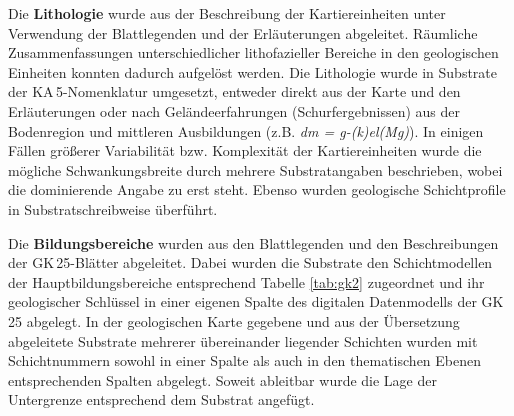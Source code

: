 Die \textbf{Lithologie} wurde aus der Beschreibung der Kartiereinheiten  unter Verwendung der Blattlegenden und der Erläuterungen abgeleitet. Räumliche Zusammenfassungen unterschiedlicher lithofazieller Bereiche in den geologischen Einheiten konnten dadurch aufgelöst werden. Die Lithologie wurde in Substrate der KA\,5-Nomenklatur umgesetzt, entweder direkt aus der Karte und den Erläuterungen oder nach Geländeerfahrungen (Schurfergebnissen) aus der Bodenregion und mittleren Ausbildungen (z.B. \textit{dm = g-(k)el(Mg)}).  In einigen Fällen größerer Variabilität bzw. Komplexität der Kartiereinheiten wurde die mögliche Schwankungsbreite durch mehrere Substratangaben beschrieben, wobei die dominierende Angabe zu erst steht. Ebenso wurden geologische Schichtprofile in Substratschreibweise überführt.\

Die \textbf{Bildungsbereiche} wurden aus den Blattlegenden und den Beschreibungen der GK\,25-Blätter abgeleitet. Dabei wurden die Substrate den Schichtmodellen der Hauptbildungsbereiche entsprechend Tabelle \ref{tab:gk2} zugeordnet und ihr geologischer Schlüssel in einer eigenen Spalte des digitalen Datenmodells der GK\,25 abgelegt. In der geologischen Karte gegebene und aus der Übersetzung abgeleitete Substrate mehrerer übereinander liegender Schichten wurden mit Schichtnummern sowohl in einer Spalte als auch in den thematischen Ebenen entsprechenden Spalten abgelegt. Soweit ableitbar wurde die Lage der Untergrenze entsprechend \citet{KA5} dem Substrat angefügt.

